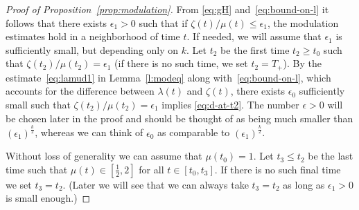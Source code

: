 \documentclass[10pt,reqno]{amsart}
\newcommand{\la}{\lambda}
\numberwithin{equation}{section}
\theoremstyle{remark}
\newcommand{\0}{\emptyset}
\newcommand{\eps}{\epsilon}
\begin{document}
\begin{proof}[Proof of Proposition~\ref{prop:modulation}]


From \eqref{eq:gH} and~\eqref{eq:bound-on-l} it follows that there exists $\eps_1 > 0$ such that if
$\zeta(t)/\mu(t) \leq \eps_1$,  the modulation estimates hold
in a neighborhood of time $t$.
If needed, we will assume that $\eps_1$ is sufficiently small, but depending only on $k$.
Let $t_2$ be the first time $t_2 \geq t_0$ such that $\zeta(t_2) / \mu(t_2) = \eps_1$
(if there is no such time, we set  $t_2 = T_+$).
By the estimate~\eqref{eq:lamud1} in Lemma~\ref{l:modeq} along with~\eqref{eq:bound-on-l}, which accounts for the difference between $\la(t)$ and $\zeta(t)$, there exists $\eps_0$ sufficiently small such that $\zeta(t_2) / \mu(t_2) = \eps_1$
implies \eqref{eq:d-at-t2}. 
The number $\eps > 0$ will be chosen later in the proof and should
be thought of as being much smaller than $(\eps_1)^\frac k2$,
whereas we can think of $\eps_0$ as comparable to $(\eps_1)^\frac k2$.

Without loss of generality we can assume that $\mu(t_0) = 1$.
Let $t_3 \leq t_2$ be the last time such that $\mu(t) \in [\frac 12, 2]$ for all $t \in [t_0, t_3]$. If there is no such final time we set $t_3= t_2$. 
(Later we will see that we can always take $t_3 = t_2$ as long as $\eps_1>0$ is small enough.)



\end{proof}
\end{document}
